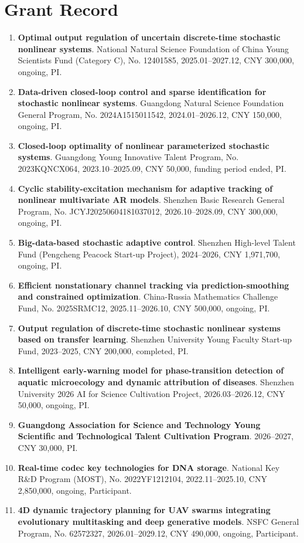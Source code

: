 \documentclass[11pt,a4paper]{article}
\begin{document}
\section{Grant Record}

\begin{enumerate}[leftmargin=1.6em,itemsep=5pt,topsep=2pt]
  \item \textbf{Optimal output regulation of uncertain discrete-time stochastic nonlinear systems}. National Natural Science Foundation of China Young Scientists Fund (Category C), No. 12401585, 2025.01--2027.12, CNY 300,000, ongoing, PI.
  \item \textbf{Data-driven closed-loop control and sparse identification for stochastic nonlinear systems}. Guangdong Natural Science Foundation General Program, No. 2024A1515011542, 2024.01--2026.12, CNY 150,000, ongoing, PI.
  \item \textbf{Closed-loop optimality of nonlinear parameterized stochastic systems}. Guangdong Young Innovative Talent Program, No. 2023KQNCX064, 2023.10--2025.09, CNY 50,000, funding period ended, PI.
  \item \textbf{Cyclic stability-excitation mechanism for adaptive tracking of nonlinear multivariate AR models}. Shenzhen Basic Research General Program, No. JCYJ20250604181037012, 2026.10--2028.09, CNY 300,000, ongoing, PI.
  \item \textbf{Big-data-based stochastic adaptive control}. Shenzhen High-level Talent Fund (Pengcheng Peacock Start-up Project), 2024--2026, CNY 1,971,700, ongoing, PI.
  \item \textbf{Efficient nonstationary channel tracking via prediction-smoothing and constrained optimization}. China-Russia Mathematics Challenge Fund, No. 2025SRMC12, 2025.11--2026.10, CNY 500,000, ongoing, PI.
  \item \textbf{Output regulation of discrete-time stochastic nonlinear systems based on transfer learning}. Shenzhen University Young Faculty Start-up Fund, 2023--2025, CNY 200,000, completed, PI.
  \item \textbf{Intelligent early-warning model for phase-transition detection of aquatic microecology and dynamic attribution of diseases}. Shenzhen University 2026 AI for Science Cultivation Project, 2026.03--2026.12, CNY 50,000, ongoing, PI.
  \item \textbf{Guangdong Association for Science and Technology Young Scientific and Technological Talent Cultivation Program}. 2026--2027, CNY 30,000, PI.
  \item \textbf{Real-time codec key technologies for DNA storage}. National Key R\&D Program (MOST), No. 2022YF1212104, 2022.11--2025.10, CNY 2,850,000, ongoing, Participant.
  \item \textbf{4D dynamic trajectory planning for UAV swarms integrating evolutionary multitasking and deep generative models}. NSFC General Program, No. 62572327, 2026.01--2029.12, CNY 490,000, ongoing, Participant.
\end{enumerate}
\end{document}

